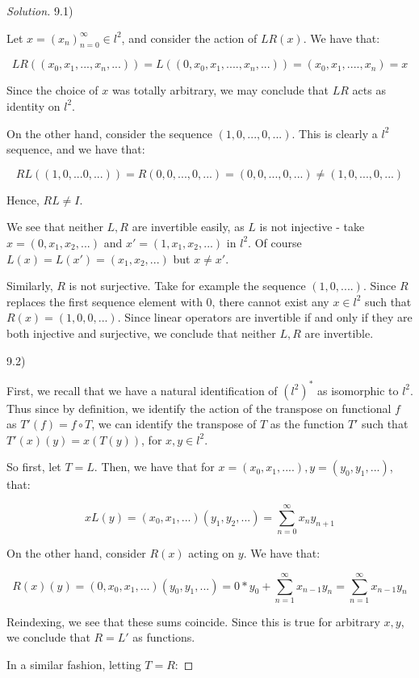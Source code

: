 \documentclass[10pt]{article}
\begin{document}
\begin{proof}[Solution]

9.1)

Let $x  = (x_n)_{n=0}^\infty  \in l^2$, and consider the action of $LR(x)$. We have that:

$$ LR((x_0,x_1,...,x_n,...)) = L((0,x_0,x_1,....,x_n,...)) = (x_0,x_1,....,x_n) = x $$

Since the choice of $x$ was totally arbitrary, we may conclude that $LR$ acts as identity on $l^2$.

On the other hand, consider the sequence $(1,0,...,0,...)$. This is clearly a $l^2$ sequence, and we have that:

$$ RL((1,0,...0,...)) = R(0,0,...,0,...) = (0,0,...,0,...) \not = (1,0,...,0,...) $$

Hence, $RL \not = I$.

We see that neither $L, R$ are invertible easily, as $L$ is not injective - take $x = (0,x_1,x_2,...)$ and $x' = (1,x_1,x_2,...)$ in $l^2$. Of course $L(x) = L(x') = (x_1,x_2,...)$ but $x \not = x'$.

Similarly, $R$ is not surjective. Take for example the sequence $(1,0,....)$. Since $R$ replaces the first sequence element with $0$, there cannot exist any $x \in l^2$ such that $R(x) = (1,0,0,...)$. Since linear operators are invertible if and only if they are both injective and surjective, we conclude that neither $L, R$ are invertible.

9.2)

First, we recall that we have a natural identification of $(l^2)^*$ as isomorphic to $l^2$. Thus since by definition, we identify the action of the transpose on functional $f$ as $T'(f) = f \circ T$, we can identify the transpose of $T$ as the function $T'$ such that $T'(x)(y) = x(T(y))$, for $x, y \in l^2$.

So first, let $T = L$. Then, we have that for $x = (x_0,x_1,....), y = (y_0,y_1,...)$, that:

$$ x L(y) =(x_0,x_1,...)(y_1,y_2,...) =  \sum_{n=0}^\infty x_n y_{n+1} $$

On the other hand, consider $R(x)$ acting on $y$. We have that:

$$ R(x)(y) = (0, x_0,x_1,...)(y_0,y_1,...) = 0 * y_0 + \sum_{n=1}^\infty x_{n-1}y_n =  \sum_{n=1}^\infty x_{n-1}y_n$$

Reindexing, we see that these sums coincide. Since this is true for arbitrary $x, y$, we conclude that $R = L'$ as functions.

In a similar fashion, letting $T = R$:


\end{proof}
\end{document}
